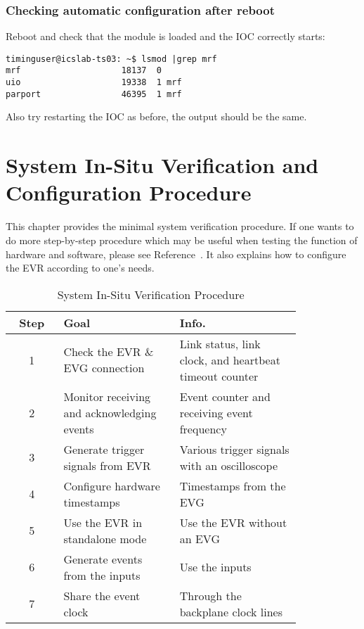 \documentclass[11pt
  , a4paper
  , article
  , oneside
  , showtrims
]{memoir}
\begin{document}
{\subsection{Checking automatic configuration after reboot}
Reboot and check that the module is loaded and the IOC correctly starts:
\begin{lstlisting}[style=termstyle]
timinguser@icslab-ts03: ~$ lsmod |grep mrf
mrf                    18137  0
uio                    19338  1 mrf
parport                46395  1 mrf
\end{lstlisting}
Also try restarting the IOC as before, the output should be the same.



\newpage
\chapter{System In-Situ Verification and Configuration Procedure}
This chapter provides the minimal system verification procedure. If one wants to do more step-by-step procedure which may be useful when testing the function of hardware and software, please see Reference~\citep[see][p14]{EVR-USER-GUIDE}. It also explains how to configure the EVR according to one's needs.

\begin{table}[!htb]
  \centering
  \begin{tabular}{c|p{0.4\linewidth}|p{0.42\linewidth}}
    \toprule
    Step & Goal                                       & Info.                                                  \\\midrule
    1    & Check the EVR \& EVG connection            & Link status, link clock, and heartbeat timeout counter \\\midrule
    2    & Monitor receiving and acknowledging events & Event counter and receiving event frequency            \\\midrule
    3    & Generate trigger signals from EVR          & Various trigger signals with an oscilloscope           \\\midrule
    4    & Configure hardware timestamps              & Timestamps from the EVG                                \\\midrule
    5    & Use the EVR in standalone mode             & Use the EVR without an EVG                             \\\midrule
    6    & Generate events from the inputs            & Use the inputs                                         \\\midrule
    7    & Share the event clock                      & Through the backplane clock lines                      \\\bottomrule
  \end{tabular}
  \caption[]{System In-Situ Verification Procedure}
  \label{table:checklist}
\end{table}


}
\end{document}
